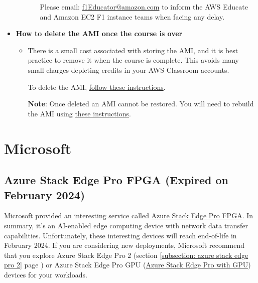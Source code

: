 \documentclass[a4paper]{article}
\begin{document}
\begin{itemize}
\begin{itemize}
\begin{enumerate}
                Please email: \href{f1Educator@amazon.com}{f1Educator@amazon.com} to inform the AWS Educate and Amazon EC2 F1 instance teams when facing any delay.
            \end{enumerate}
        \end{itemize}

        \item[\ding{42}] \textbf{How to delete the AMI once the course is over}
        \begin{itemize}
            \item[\ding{45}] There is a small cost associated with storing the AMI, and it is best practice to remove it when the course is complete. This avoids many small charges depleting credits in your AWS Classroom accounts.

            To delete the AMI, \href{https://docs.aws.amazon.com/AWSEC2/latest/UserGuide/deregister-ami.html#clean-up-ebs-ami}{follow these instructions}.
            
            \textbf{Note}: Once deleted an AMI cannot be restored. You will need to rebuild the AMI using \href{https://github.com/aws-samples/aws-fpga-classroom-setup/blob/main/README.md}{these instructions}.
        \end{itemize}
    \end{itemize}

    \newpage

    \section{Microsoft}

    \subsection{Azure Stack Edge Pro FPGA (Expired on February 2024)}

    Microsoft provided an interesting service called \href{https://learn.microsoft.com/en-us/azure/databox-online/azure-stack-edge-overview}{Azure Stack Edge Pro FPGA}. In summary, it's an AI-enabled edge computing device with network data transfer capabilities. Unfortunately, these interesting devices will reach end-of-life in February 2024. If you are considering new deployments, Microsoft recommend that you explore Azure Stack Edge Pro 2 (section \ref{subsection: azure stack edge pro 2} page \pageref{subsection: azure stack edge pro 2}) or Azure Stack Edge Pro GPU (\href{https://learn.microsoft.com/en-us/azure/databox-online/azure-stack-edge-gpu-overview}{Azure Stack Edge Pro with GPU}) devices for your workloads.\newline
\end{document}
